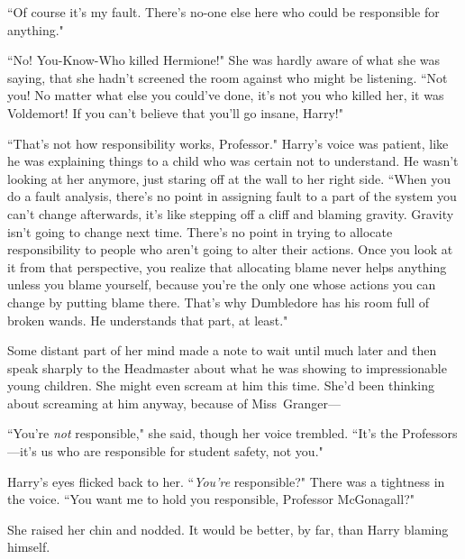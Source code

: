 ``Of course it's my fault. There's no-one else here who could be responsible for anything."

``No! You-Know-Who killed Hermione!" She was hardly aware of what she was saying, that she hadn't screened the room against who might be listening. ``Not you! No matter what else you could've done, it's not you who killed her, it was Voldemort! If you can't believe that you'll go insane, Harry!"

``That's not how responsibility works, Professor." Harry's voice was patient, like he was explaining things to a child who was certain not to understand. He wasn't looking at her anymore, just staring off at the wall to her right side. ``When you do a fault analysis, there's no point in assigning fault to a part of the system you can't change afterwards, it's like stepping off a cliff and blaming gravity. Gravity isn't going to change next time. There's no point in trying to allocate responsibility to people who aren't going to alter their actions. Once you look at it from that perspective, you realize that allocating blame never helps anything unless you blame yourself, because you're the only one whose actions you can change by putting blame there. That's why Dumbledore has his room full of broken wands. He understands that part, at least."

Some distant part of her mind made a note to wait until much later and then speak sharply to the Headmaster about what he was showing to impressionable young children. She might even scream at him this time. She'd been thinking about screaming at him anyway, because of Miss~Granger—

``You're \emph{not} responsible," she said, though her voice trembled. ``It's the Professors—it's us who are responsible for student safety, not you."

Harry's eyes flicked back to her. ``\emph{You're} responsible?" There was a tightness in the voice. ``You want me to hold you responsible, Professor McGonagall?"

She raised her chin and nodded. It would be better, by far, than Harry blaming himself.

